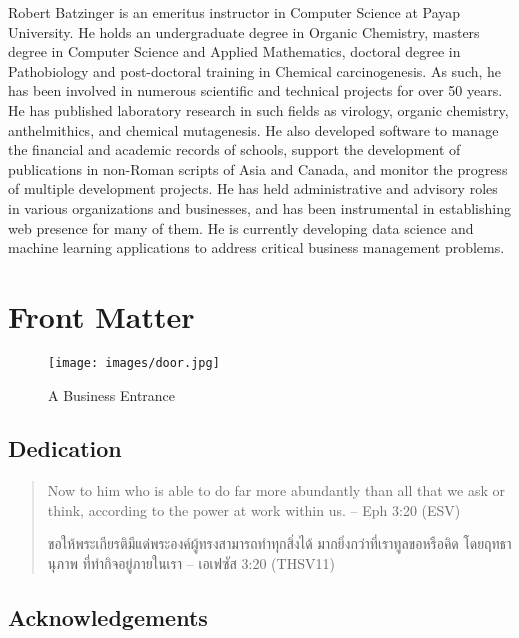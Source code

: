 \documentclass[]{book}
\begin{document}
Robert Batzinger is an emeritus instructor in Computer Science at Payap University. He holds an undergraduate degree in Organic Chemistry, masters degree in Computer Science and Applied Mathematics, doctoral degree in Pathobiology and post-doctoral training in Chemical carcinogenesis. As such, he has been involved in numerous scientific and technical projects for over 50 years. He has published laboratory research in such fields as virology, organic chemistry, anthelmithics, and chemical mutagenesis. He also developed software to manage the financial and academic records of schools, support the development of publications in non-Roman scripts of Asia and Canada, and monitor the progress of multiple development projects. He has held administrative and advisory roles in various organizations and businesses, and has been instrumental in establishing web presence for many of them. He is currently developing data science and machine learning applications to address critical business management problems.

\hypertarget{front-matter}{%
\chapter*{Front Matter}\label{front-matter}}

\begin{figure}
\centering
\texttt{[image: images/door.jpg]}
\caption{A Business Entrance}
\end{figure}

\hypertarget{dedication}{%
\section*{Dedication}\label{dedication}}

\begin{quote}
Now to him who is able to do far more abundantly
than all that we ask or think, according
to the power at work within us.
-- Eph 3:20 (ESV)

ขอให้พระเกียรติมีแด่พระองค์ผู้ทรงสามารถทำทุกสิ่งได้
มากยิ่งกว่าที่เราทูลขอหรือคิด โดยฤทธานุภาพ
ที่ทำกิจอยู่ภายในเรา
-- เอเฟซัส 3:20 (THSV11)
\end{quote}

\hypertarget{acknowledgements}{%
\section*{Acknowledgements}\label{acknowledgements}}
\end{document}
